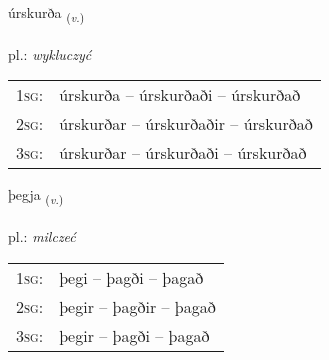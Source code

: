 \documentclass[frontgrid, backgrid]{flacards}\usepackage[]{graphicx}\usepackage[]{xcolor}
\begin{document}
\renewcommand{\flhead}{\vskip5pt \fboxsep=0pt {\small\bfseries\footnotesize Sagnorð | czasownik}}
\renewcommand{\fcfoot}{\vskip5pt \fboxsep=0pt \hspace{2pt}{\small\bfseries\footnotesize 3K}}

\renewcommand{\blhead}{\vskip5pt {\small\bfseries\footnotesize Sagnorð | czasownik }}
\renewcommand{\bcfoot}{\vskip5pt \hspace{2pt}{\small\bfseries\footnotesize 3K}}


{úrskurða \small{\textsubscript{(\textit{v.})}} \\[1ex] %
\textphonetic{[ur̥skʏrða]} \\
pl.: \emph{wykluczyć} \\  [2ex]
\renewcommand*{\arraystretch}{0.8}
\begin{tabular}{p{1cm}l}
\textsc{1sg}: & úrskurða -- úrskurðaði -- úrskurðað \\ 
\textsc{2sg}: & úrskurðar -- úrskurðaðir -- úrskurðað \\ 
\textsc{3sg}: & úrskurðar -- úrskurðaði -- úrskurðað \\ 
\end{tabular}
}

\renewcommand{\flhead}{\vskip5pt \fboxsep=0pt {\small\bfseries\footnotesize Sagnorð | czasownik}}
\renewcommand{\fcfoot}{\vskip5pt \fboxsep=0pt \hspace{2pt}{\small\bfseries\footnotesize 3K}}

\renewcommand{\blhead}{\vskip5pt {\small\bfseries\footnotesize Sagnorð | czasownik }}
\renewcommand{\bcfoot}{\vskip5pt \hspace{2pt}{\small\bfseries\footnotesize 3K}}


{þegja \small{\textsubscript{(\textit{v.})}} \\[1ex] %
\textphonetic{[θeija]} \\
pl.: \emph{milczeć} \\  [2ex]
\renewcommand*{\arraystretch}{0.8}
\begin{tabular}{p{1cm}l}
\textsc{1sg}: & þegi -- þagði -- þagað \\ 
\textsc{2sg}: & þegir -- þagðir -- þagað \\ 
\textsc{3sg}: & þegir -- þagði -- þagað \\ 
\end{tabular}
}
\end{document}
